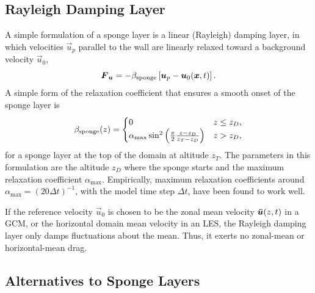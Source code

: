 \documentclass{report}
\begin{document}
\subsection{Rayleigh Damping Layer}

A simple formulation of a sponge layer is a linear (Rayleigh) damping layer, in which velocities $\vec{u}_p$ parallel to the wall are linearly relaxed toward a background velocity $\vec{u}_0$,
\begin{equation*}
\vec{F}_{\vec{u}} = -\beta_{\rm sponge} \left[\vec{u}_p - \vec{u}_0(\vec{x}, t)\right].
\end{equation*}
A simple form of the relaxation coefficient that ensures a smooth onset of the sponge layer is \citep{klemp:1978a}
\begin{equation}\label{eq:spongeDurran}
\beta_{\rm sponge}(z) =  
  \begin{cases}
    0 &  z\leq z_D,\\
    \alpha_{\max} \sin^2 \left( \frac{\pi}{2}\frac{z - z_D}{z_T - z_D} \right) & z > z_D,
    \end{cases}
\end{equation}
for a sponge layer at the top of the domain at altitude $z_T$. The parameters in this formulation are the altitude $z_D$ where the sponge starts and the maximum relaxation coefficient $\alpha_{\max}$. Empirically, maximum relaxation coefficients around $\alpha_{\max} = (20 \Delta t)^{-1}$, with the model time step $\Delta t$, have been found to work well.

If the reference velocity $\vec{u}_0$ is chosen to be the zonal mean velocity $\vec{\Bar u}(z, t)$ in a GCM, or the horizontal domain mean velocity in an LES, the Rayleigh damping layer only damps fluctuations about the mean. Thus, it exerts no zonal-mean or horizontal-mean drag.  

\subsection{Alternatives to Sponge Layers}
\end{document}
